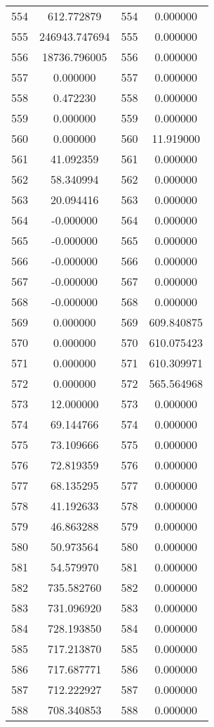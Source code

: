 \documentclass[12pt]{article}
\begin{document}
\begin{longtable}{@{}cccc@{}}
554 & 612.772879 & 554 & 0.000000 \\
555 & 246943.747694 & 555 & 0.000000 \\
556 & 18736.796005 & 556 & 0.000000 \\
557 & 0.000000 & 557 & 0.000000 \\
558 & 0.472230 & 558 & 0.000000 \\
559 & 0.000000 & 559 & 0.000000 \\
560 & 0.000000 & 560 & 11.919000 \\
561 & 41.092359 & 561 & 0.000000 \\
562 & 58.340994 & 562 & 0.000000 \\
563 & 20.094416 & 563 & 0.000000 \\
564 & -0.000000 & 564 & 0.000000 \\
565 & -0.000000 & 565 & 0.000000 \\
566 & -0.000000 & 566 & 0.000000 \\
567 & -0.000000 & 567 & 0.000000 \\
568 & -0.000000 & 568 & 0.000000 \\
569 & 0.000000 & 569 & 609.840875 \\
570 & 0.000000 & 570 & 610.075423 \\
571 & 0.000000 & 571 & 610.309971 \\
572 & 0.000000 & 572 & 565.564968 \\
573 & 12.000000 & 573 & 0.000000 \\
574 & 69.144766 & 574 & 0.000000 \\
575 & 73.109666 & 575 & 0.000000 \\
576 & 72.819359 & 576 & 0.000000 \\
577 & 68.135295 & 577 & 0.000000 \\
578 & 41.192633 & 578 & 0.000000 \\
579 & 46.863288 & 579 & 0.000000 \\
580 & 50.973564 & 580 & 0.000000 \\
581 & 54.579970 & 581 & 0.000000 \\
582 & 735.582760 & 582 & 0.000000 \\
583 & 731.096920 & 583 & 0.000000 \\
584 & 728.193850 & 584 & 0.000000 \\
585 & 717.213870 & 585 & 0.000000 \\
586 & 717.687771 & 586 & 0.000000 \\
587 & 712.222927 & 587 & 0.000000 \\
588 & 708.340853 & 588 & 0.000000 \\

\end{longtable}
\end{document}
